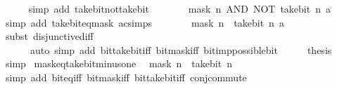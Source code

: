 \begin{isabellebody}
\ \ \ \ \isamarkupfalse%
\ {\isacharparenleft}{\kern0pt}simp\ add{\isacharcolon}{\kern0pt}\ take{\isacharunderscore}{\kern0pt}bit{\isacharunderscore}{\kern0pt}not{\isacharunderscore}{\kern0pt}take{\isacharunderscore}{\kern0pt}bit{\isacharparenright}{\kern0pt}\isanewline
\ \ \isamarkupfalse%
\ \isamarkupfalse%
\ {\isacartoucheopen}{\isasymdots}\ {\isacharequal}{\kern0pt}\ mask\ n\ AND\ NOT\ {\isacharparenleft}{\kern0pt}take{\isacharunderscore}{\kern0pt}bit\ n\ a{\isacharparenright}{\kern0pt}{\isacartoucheclose}\isanewline
\ \ \ \ \isamarkupfalse%
\ {\isacharparenleft}{\kern0pt}simp\ add{\isacharcolon}{\kern0pt}\ take{\isacharunderscore}{\kern0pt}bit{\isacharunderscore}{\kern0pt}eq{\isacharunderscore}{\kern0pt}mask\ ac{\isacharunderscore}{\kern0pt}simps{\isacharparenright}{\kern0pt}\isanewline
\ \ \isamarkupfalse%
\ \isamarkupfalse%
\ {\isacartoucheopen}{\isasymdots}\ {\isacharequal}{\kern0pt}\ mask\ n\ {\isacharminus}{\kern0pt}\ take{\isacharunderscore}{\kern0pt}bit\ n\ a{\isacartoucheclose}\isanewline
\ \ \ \ \isamarkupfalse%
\ {\isacharparenleft}{\kern0pt}subst\ disjunctive{\isacharunderscore}{\kern0pt}diff{\isacharparenright}{\kern0pt}\isanewline
\ \ \ \ \ \ {\isacharparenleft}{\kern0pt}auto\ simp\ add{\isacharcolon}{\kern0pt}\ bit{\isacharunderscore}{\kern0pt}take{\isacharunderscore}{\kern0pt}bit{\isacharunderscore}{\kern0pt}iff\ bit{\isacharunderscore}{\kern0pt}mask{\isacharunderscore}{\kern0pt}iff\ bit{\isacharunderscore}{\kern0pt}imp{\isacharunderscore}{\kern0pt}possible{\isacharunderscore}{\kern0pt}bit{\isacharparenright}{\kern0pt}\isanewline
\ \ \isamarkupfalse%
\ \isamarkupfalse%
\ {\isacharquery}{\kern0pt}thesis\isanewline
\ \ \ \ \isamarkupfalse%
\ simp\isanewline
{}\isamarkupfalse%
%
\endisatagproof
{\isafoldproof}%
%
\isadelimproof
\isanewline
%
\endisadelimproof
\isanewline
{}\isamarkupfalse%
\ mask{\isacharunderscore}{\kern0pt}eq{\isacharunderscore}{\kern0pt}take{\isacharunderscore}{\kern0pt}bit{\isacharunderscore}{\kern0pt}minus{\isacharunderscore}{\kern0pt}one{\isacharcolon}{\kern0pt}\isanewline
\ \ {\isacartoucheopen}mask\ n\ {\isacharequal}{\kern0pt}\ take{\isacharunderscore}{\kern0pt}bit\ n\ {\isacharparenleft}{\kern0pt}{\isacharminus}{\kern0pt}\ {}{\isacharparenright}{\kern0pt}{\isacartoucheclose}\isanewline
%
\isadelimproof
\ \ %
\endisadelimproof
%
\isatagproof
{}\isamarkupfalse%
\ {\isacharparenleft}{\kern0pt}simp\ add{\isacharcolon}{\kern0pt}\ bit{\isacharunderscore}{\kern0pt}eq{\isacharunderscore}{\kern0pt}iff\ bit{\isacharunderscore}{\kern0pt}mask{\isacharunderscore}{\kern0pt}iff\ bit{\isacharunderscore}{\kern0pt}take{\isacharunderscore}{\kern0pt}bit{\isacharunderscore}{\kern0pt}iff\ conj{\isacharunderscore}{\kern0pt}commute{\isacharparenright}{\kern0pt}%

\end{isabellebody}
